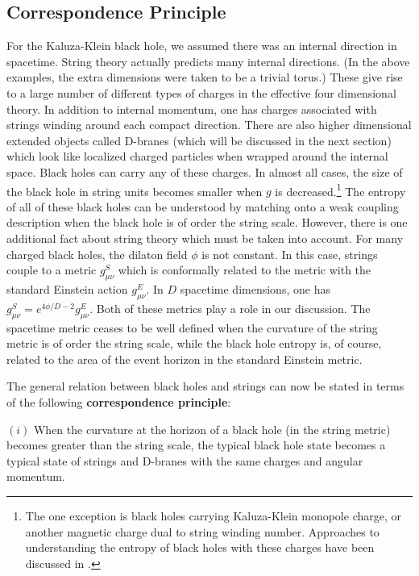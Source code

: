 \subsection{Correspondence Principle}

For the Kaluza-Klein black hole,
we assumed there was an internal direction in spacetime. String theory
actually predicts many internal directions. (In the above
examples, the extra dimensions were taken to be a trivial torus.)
These give rise to a large number of different types of charges 
in the effective four dimensional theory. In addition to internal momentum,
one has charges associated with strings winding around each compact direction.
There are also higher dimensional extended objects called D-branes
(which will be discussed in the next section) which look like localized
charged particles when wrapped around the internal space. Black holes
can carry any of these charges. In almost all cases, the size of the
black hole in string units becomes smaller when $g$ is decreased.\footnote{The
one exception is black holes carrying Kaluza-Klein monopole charge, or
another magnetic charge dual to string winding  number.  Approaches to
understanding the entropy of black holes with these charges have been discussed
in \cite{lawi,cvts,dvv1}.} 
The entropy of all of these black holes can be understood
by matching onto a weak coupling description when the black hole is of
order the string scale. However, there is one additional fact about
string theory which must be taken into account.
For many charged black holes, the dilaton field $\phi$ is not
constant. In this case, strings couple to a metric $g_{\mu\nu}^S$ which
is  conformally related to the metric with the standard Einstein action 
$g_{\mu\nu}^E$. In $D$ spacetime dimensions, one has 
$g_{\mu\nu}^S = e^{4\phi/D-2} g_{\mu\nu}^E$. 
Both of these metrics play a role in our discussion.
The spacetime metric ceases to be well defined when the curvature of the string
metric is of order the string scale, while the black hole entropy
is, of course, related to the area of the event horizon in the standard
Einstein metric. 

The general relation between black holes and strings
can now be stated in terms of the following {\bf correspondence principle}:

$(i)$ When the curvature at the horizon of a black hole (in the string
metric) becomes greater than
the string scale,  the typical black hole state becomes a typical state
of strings and D-branes with the same charges and angular momentum.


